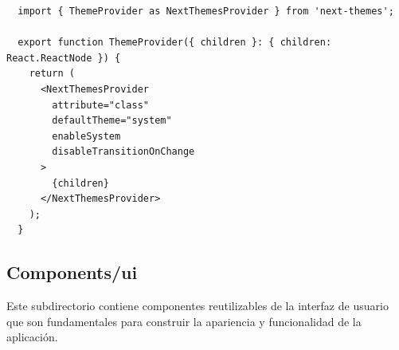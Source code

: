 \begin{verbatim}
  import { ThemeProvider as NextThemesProvider } from 'next-themes';

  export function ThemeProvider({ children }: { children: React.ReactNode }) {
    return (
      <NextThemesProvider
        attribute="class"
        defaultTheme="system"
        enableSystem
        disableTransitionOnChange
      >
        {children}
      </NextThemesProvider>
    );
  }
\end{verbatim}

\subsection{Components/ui}
Este subdirectorio contiene componentes reutilizables de la interfaz de usuario que son fundamentales para construir la apariencia y funcionalidad de la aplicación.

